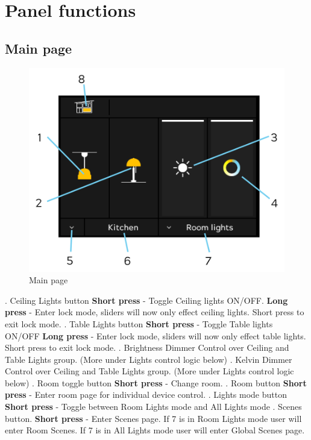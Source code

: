 \documentclass[10pt]{article}
\begin{document}
    \clearpage
    \section{Panel functions}
    \subsection{Main page}
    \begin{figure}[H]
    \centering
    \includegraphics{main_page_numbers.png}
    \caption{Main page}%
    \end{figure}
    . Ceiling Lights button \newline
    \textbf{Short press} - Toggle Ceiling lights ON/OFF. \newline
    \textbf{Long press} - Enter lock mode, sliders will now only effect ceiling lights. Short press to exit lock mode.
    . Table Lights button \newline
    \textbf{Short press} - Toggle Table lights ON/OFF \newline
    \textbf{Long press} - Enter lock mode, sliders will now only effect table lights. Short press to exit lock mode.
    . Brightness Dimmer \newline
    Control over Ceiling and Table Lights group. (More under Lights control logic below)
    . Kelvin Dimmer \newline
    Control over Ceiling and Table Lights group. (More under Lights control logic below)
    . Room toggle button \newline
    \textbf{Short press} - Change room.
    . Room button \newline
    \textbf{Short press} - Enter room page for individual device control.
    . Lights mode button \newline
    \textbf{Short press} - Toggle between Room Lights mode and All Lights mode
	  . Scenes button. \newline
    \textbf{Short press} - Enter Scenes page. If 7 is in Room Lights mode user will enter Room Scenes. If 7 is in All Lights mode user will enter Global Scenes page.
\end{document}
